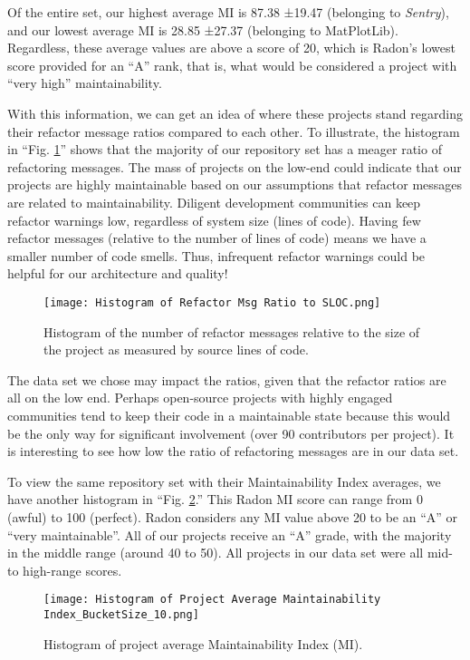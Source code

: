 Of the entire set, our highest average MI is 87.38 ±19.47 (belonging to \emph{Sentry}), and our lowest average MI is 28.85 ±27.37 (belonging to MatPlotLib). Regardless, these average values are above a score of 20, which is Radon's lowest score provided for an ``A'' rank, that is, what would be considered a project with ``very high'' maintainability.

With this information, we can get an idea of where these projects stand regarding their refactor message ratios compared to each other. To illustrate, the histogram in ``Fig. \ref{figHistogramRefactorRatio}'' shows that the majority of our repository set has a meager ratio of refactoring messages. The mass of projects on the low-end could indicate that our projects are highly maintainable based on our assumptions that refactor messages are related to maintainability. Diligent development communities can keep refactor warnings low, regardless of system size (lines of code). Having few refactor messages (relative to the number of lines of code) means we have a smaller number of code smells. Thus, infrequent refactor warnings could be helpful for our architecture and quality!

\begin{figure}[ht]
  \centerline{
    \texttt{[image: Histogram of Refactor Msg Ratio to SLOC.png]}
  }
  \caption{Histogram of the number of refactor messages relative to the size of the project as measured by source lines of code.}
  \label{figHistogramRefactorRatio}
\end{figure}

The data set we chose may impact the ratios, given that the refactor ratios are all on the low end. Perhaps open-source projects with highly engaged communities tend to keep their code in a maintainable state because this would be the only way for significant involvement (over 90 contributors per project). It is interesting to see how low the ratio of refactoring messages are in our data set.

To view the same repository set with their Maintainability Index averages, we have another histogram in ``Fig. \ref{figHistogramAvgMI}.'' This Radon MI score can range from 0 (awful) to 100 (perfect). Radon considers any MI value above 20 to be an ``A'' or ``very maintainable''. All of our projects receive an ``A'' grade, with the majority in the middle range (around 40 to 50). All projects in our data set were all mid-to high-range scores.

\begin{figure}[ht]
  \centerline{
    \texttt{[image: Histogram of Project Average Maintainability Index\_BucketSize\_10.png]}
  }
  \caption{Histogram of project average Maintainability Index (MI).}
  \label{figHistogramAvgMI}
\end{figure}

